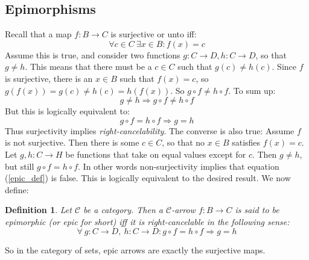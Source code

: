 \documentclass[12pt, a4paper]{article}
\newtheorem{definition}{Definition}[section]
\numberwithin{equation}{section}
\begin{document}
\subsection{Epimorphisms}
Recall that a map $f:B\rightarrow C$ is surjective or unto iff:
\begin{equation}
\forall c\in C\ \exists x\in B: f(x)=c
\end{equation}
Assume this is true, and consider two functions $g:C\rightarrow D, h:C\rightarrow D$, so that $g\neq h$. This means that there must be a $c\in C$ such that $g(c)\neq h(c)$. Since $f$ is surjective, there is an $x\in B$ such that $f(x)=c$, so $g(f(x))=g(c)\neq h(c)=h(f(x))$. So $g\circ f\neq h\circ f$. To sum up:
\begin{equation}
g\neq h\Rightarrow g\circ f\neq h\circ f
\end{equation}
But this is logically equivalent to:
\begin{equation}
\label{epic_def}
g\circ f=h\circ f\Rightarrow g=h
\end{equation}
Thus surjectivity implies \textit{right-cancelability}. The converse is also true: Assume $f$ is not surjective. Then there is some $c\in C$, so that no $x\in B$ satisfies $f(x)=c$. Let $g, h:C\rightarrow H$ be functions that take on equal values except for $c$. Then $g\neq h$, but still $g\circ f=h\circ f$. In other words non-surjectivity implies that equation (\ref{epic_def}) is false. This is logically equivalent to the desired result. We now define:
\begin{definition}
Let $\mathcal{C}$ be a category. Then a $\mathcal{C}$-arrow $f: B\rightarrow C$ is said to be epimorphic (or epic for short) iff it is right-cancelable in the following sense:
\begin{equation}
\forall\ g:C\rightarrow D,\ h:C\rightarrow D: g\circ f=h\circ f\Rightarrow g=h  
\end{equation}
\end{definition}
So in the category of sets, epic arrows are exactly the surjective maps.
\end{document}
